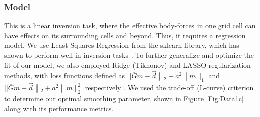 \documentclass{article}
\begin{document}

\subsubsection{Model}

This is a linear inversion task, where the effective body-forces in one grid cell can have effects on its surrounding cells and beyond. Thus, it requires a regression model. We use Least Squares Regression from the sklearn library, which has shown to perform well in inversion tasks \cite{lines_review_1984}. To further generalize and optimize the fit of our model, we also employed Ridge (Tikhonov) and LASSO regularization methods, with loss functions defined as $|| \overline{\overline{G}} m-\vec{d}\left\|_{2}+a^{2}\right\| m \|_{1}$ and $|| \overline{\overline{G}} m-\vec{d}\left\|_{2}+a^{2}\right\| m \|_{2}^{2}$ respectively \cite{marquardt_ridge_1975, tibshirani_regression_2011}. We used the trade-off (L-curve) criterion to determine our optimal smoothing parameter, shown in Figure \ref{Fig:Data1c} along with its performance metrics.
\end{document}
